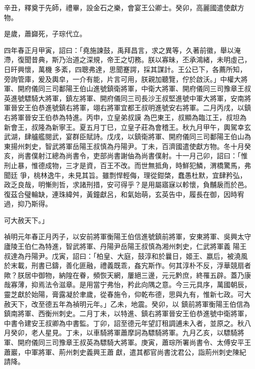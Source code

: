 \begin{pinyinscope}
 辛丑，釋奠于先師，禮畢，設金石之樂，會宴王公卿士。癸卯，高麗國遣使獻方物。



 是歲，蕭巋死，子琮代立。



 四年春正月甲寅，詔曰：「堯施諫鼓，禹拜昌言，求之異等，久著前徽，舉以淹滯，復聞昔典，斯乃治道之深規，帝王之切務。朕以寡昧，丕承鴻緒，未明虛己，日旰興懷，萬機
 多紊，四聰弗達，思聞蹇諤，採其謀計。王公已下，各薦所知，旁詢管庫，爰及輿皁，一介有能，片言可用，朕親加聽覽，佇於啟沃。」中權大將軍、開府儀同三司鄱陽王伯山進號鎮衛將軍，中衛大將軍、開府儀同三司豫章王叔英進號驃騎大將軍，鎮左將軍、開府儀同三司長沙王叔堅進號中軍大將軍，安南將軍晉安王伯恭進號鎮右將軍，翊右將軍宜都王叔明進號安右將軍。二月丙戌，以鎮右將軍晉安王伯恭為特進。丙申，立皇弟叔謨
 為巴東王，叔顯為臨江王，叔坦為新會王，叔隆為新寧王。夏五月丁巳，立皇子莊為會稽王。秋九月甲午，輿駕幸玄武湖，肆艫艦閱武，宴群臣賦詩。戊戌，以鎮衛將軍、開府儀同三司鄱陽王伯山為東揚州刺史，智武將軍岳陽王叔慎為丹陽尹。丁未，百濟國遣使獻方物。冬十月癸亥，尚書僕射江總為尚書令，吏部尚書謝伷為尚書僕射。十一月己卯，詔曰：「惟刑止暴，惟德成物，三才是資，百王不改。而世無抵角，時鮮犯鱗，渭橋驚馬，弗聞廷
 爭，桃林逸牛，未見其旨。雖剽悍輕侮，理從鉗棨，蠢愚杜默，宜肆矜弘，政乏良哉，明慚則哲，求諸刑措，安可得乎？是用屬寤寐以軫懷，負黼扆而於邑。復茲合璧輪缺，連珠緯舛，黃鐘獻呂，和氣始萌，玄英告中，履長在御，因時宥過，抑乃斯得。



 可大赦天下。」



 禎明元年春正月丙子，以安前將軍衡陽王伯信進號鎮前將軍，安東將軍、吳興太守廬陵王伯仁為特進，智武將軍、丹陽尹岳陽王叔慎為湘州刺史，仁武將軍義
 陽王叔達為丹陽尹。戊寅，詔曰：「柏皇、大庭，鼓淳和於曩日，姬王、嬴后，被澆風於末載，刑書已鑄，善化匪融，禮義既乖，姦宄斯作。何其淳朴不反，浮華競扇者歟？朕居中御物，納隍在眷，頻恢天網，屢絕三邊，元元黔庶，終罹五辟。蓋乃康哉寡薄，抑焉法令滋章。是用當宁弗怡，矜此向隅之意。今三元具序，萬國朝辰，靈芝獻於始陽，膏露凝於聿歲，從春施令，仰乾布德，思與九有，惟新七政。可大赦天下，改至德五年為禎明元年。」乙未，地震。癸卯，以
 鎮前將軍衡陽王伯信為鎮南將軍、西衡州刺史。二月丁未，以特進、鎮右將軍晉安王伯恭進號中衛將軍，中書令建安王叔卿為中書監。丁卯，詔至德元年望訂租調逋未入者，並原之。秋八月癸卯，老人星見。丁未，以車騎將軍蕭摩訶為驃騎將軍。九月乙亥，以驃騎將軍、開府儀同三司豫章王叔英為驃騎大將軍。庚寅，蕭琮所署尚書令、太傅安平王蕭巖，中軍將軍、荊州刺史義興王蕭獻，遣其都官尚書沈君公，詣荊州刺史陳紀請降。




\end{pinyinscope}
